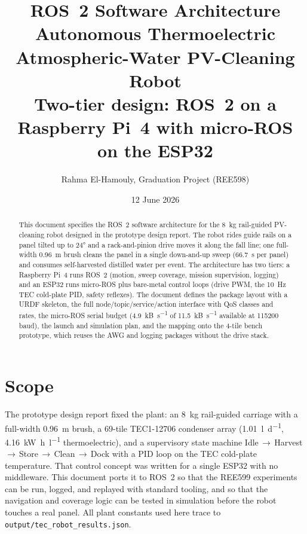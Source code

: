 \documentclass[11pt,a4paper]{article}
\title{\textbf{ROS~2 Software Architecture}\\[0.4em]
\large Autonomous Thermoelectric Atmospheric-Water PV-Cleaning Robot\\[0.2em]
\normalsize Two-tier design: ROS~2 on a Raspberry Pi~4 with micro-ROS on the ESP32}
\author{Rahma El-Hamouly, Graduation Project (REE598)}
\date{12 June 2026}
\begin{document}
\maketitle

\begin{abstract}
\noindent
This document specifies the ROS~2 software architecture for the \SI{8}{\kilo\gram}
rail-guided PV-cleaning robot designed in the prototype design report. The robot
rides guide rails on a panel tilted up to \ang{24} and a rack-and-pinion drive moves
it along the fall line; one full-width \SI{0.96}{\metre} brush cleans the panel in a
single down-and-up sweep (\SI{66.7}{\second} per panel) and consumes self-harvested
distilled water per event. The architecture has two tiers: a Raspberry Pi~4 runs
ROS~2 (motion, sweep coverage, mission supervision, logging) and an ESP32
runs micro-ROS plus bare-metal control loops (drive PWM, the \SI{10}{\hertz} TEC
cold-plate PID, safety reflexes). The document defines the package layout with a
URDF skeleton, the full node/topic/service/action interface with QoS classes and
rates, the micro-ROS serial budget (\SI{4.9}{\kilo B\per\second} of
\SI{11.5}{\kilo B\per\second} available at \num{115200}\,baud), the launch and
simulation plan, and the mapping onto the 4-tile bench prototype, which reuses the
AWG and logging packages without the drive stack.
\end{abstract}

{\setcounter{tocdepth}{1}\tableofcontents}
\newpage

\section{Scope}
The prototype design report fixed the plant: an \SI{8}{\kilo\gram} rail-guided
carriage with a full-width \SI{0.96}{\metre} brush, a 69-tile TEC1-12706 condenser array
(\SI{1.01}{\litre\per\day}, \SI{4.16}{\kilo\watt\hour\per\litre} thermoelectric),
and a supervisory state machine Idle\,$\to$\,Harvest\,$\to$\,Store\,$\to$\,Clean\,$\to$\,Dock
with a PID loop on the TEC cold-plate temperature. That control concept was written
for a single ESP32 with no middleware. This document ports it to ROS~2 so that the
REE599 experiments can be run, logged, and replayed with standard tooling, and so
that the navigation and coverage logic can be tested in simulation before the robot
touches a real panel. All plant constants used here trace to
\texttt{output/tec\_robot\_results.json}.
\end{document}
